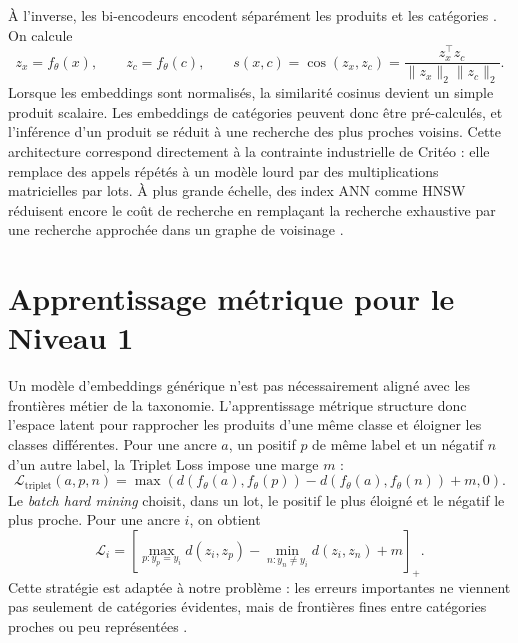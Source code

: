 \documentclass[12pt,a4paper]{report}
\begin{document}
À l'inverse, les bi-encodeurs encodent séparément les produits et les catégories \cite{reimers2019sentence,karpukhin2020dpr}. On calcule
\begin{equation}
    z_x = f_\theta(x),
    \qquad
    z_c = f_\theta(c),
    \qquad
    s(x,c)
    =
    \cos(z_x,z_c)
    =
    \frac{z_x^\top z_c}{\|z_x\|_2\|z_c\|_2}.
\end{equation}
Lorsque les embeddings sont normalisés, la similarité cosinus devient un simple produit scalaire. Les embeddings de catégories peuvent donc être pré-calculés, et l'inférence d'un produit se réduit à une recherche des plus proches voisins. Cette architecture correspond directement à la contrainte industrielle de Critéo : elle remplace des appels répétés à un modèle lourd par des multiplications matricielles par lots. À plus grande échelle, des index ANN comme HNSW réduisent encore le coût de recherche en remplaçant la recherche exhaustive par une recherche approchée dans un graphe de voisinage \cite{malkov2020hnsw}.

\section{Apprentissage métrique pour le Niveau 1}
\label{sec:triplet}

Un modèle d'embeddings générique n'est pas nécessairement aligné avec les frontières métier de la taxonomie. L'apprentissage métrique structure donc l'espace latent pour rapprocher les produits d'une même classe et éloigner les classes différentes. Pour une ancre $a$, un positif $p$ de même label et un négatif $n$ d'un autre label, la Triplet Loss impose une marge $m$ :
\begin{equation}
    \mathcal{L}_{\text{triplet}}(a,p,n)
    =
    \max\left(
    d(f_\theta(a),f_\theta(p))
    -
    d(f_\theta(a),f_\theta(n))
    +m,
    0
    \right).
\end{equation}
Le \textit{batch hard mining} choisit, dans un lot, le positif le plus éloigné et le négatif le plus proche. Pour une ancre $i$, on obtient
\begin{equation}
    \mathcal{L}_i
    =
    \left[
    \max_{p:y_p=y_i} d(z_i,z_p)
    -
    \min_{n:y_n\neq y_i} d(z_i,z_n)
    +m
    \right]_+.
\end{equation}
Cette stratégie est adaptée à notre problème : les erreurs importantes ne viennent pas seulement de catégories évidentes, mais de frontières fines entre catégories proches ou peu représentées \cite{schroff2015facenet,hermans2017triplet}.
\end{document}
